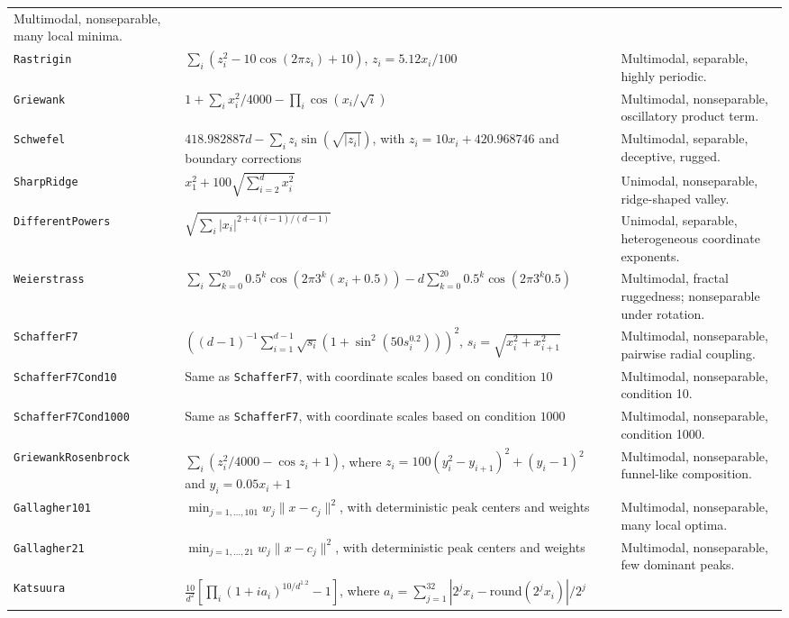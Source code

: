 \documentclass[journal]{IEEEtran}
\theoremstyle{remark}
\theoremstyle{plain}
\begin{document}
\begin{longtable}{@{}p{}p{}p{}@{}}
	Multimodal, nonseparable, many local minima. \\
	\texttt{Rastrigin} &
	\(\sum_i (z_i^2-10\cos(2\pi z_i)+10)\), \(z_i=5.12x_i/100\) &
	Multimodal, separable, highly periodic. \\
	\texttt{Griewank} &
	\(1+\sum_i x_i^2/4000-\prod_i\cos(x_i/\sqrt{i})\) &
	Multimodal, nonseparable, oscillatory product term. \\
	\texttt{Schwefel} &
	\(418.982887d-\sum_i z_i\sin(\sqrt{|z_i|})\), with
	\(z_i=10x_i+420.968746\) and boundary corrections &
	Multimodal, separable, deceptive, rugged. \\
	\texttt{SharpRidge} &
	\(x_1^2+100\sqrt{\sum_{i=2}^d x_i^2}\) &
	Unimodal, nonseparable, ridge-shaped valley. \\
	\texttt{DifferentPowers} &
	\(\sqrt{\sum_i |x_i|^{2+4(i-1)/(d-1)}}\) &
	Unimodal, separable, heterogeneous coordinate exponents. \\
	\texttt{Weierstrass} &
	\(\sum_i\sum_{k=0}^{20}0.5^k\cos(2\pi3^k(x_i+0.5))
	-d\sum_{k=0}^{20}0.5^k\cos(2\pi3^k0.5)\) &
	Multimodal, fractal ruggedness; nonseparable under rotation. \\
	\texttt{SchafferF7} &
	\(\left((d-1)^{-1}\sum_{i=1}^{d-1}\sqrt{s_i}
	(1+\sin^2(50s_i^{0.2}))\right)^2\),
	\(s_i=\sqrt{x_i^2+x_{i+1}^2}\) &
	Multimodal, nonseparable, pairwise radial coupling. \\
	\texttt{SchafferF7Cond10} &
	Same as \texttt{SchafferF7}, with coordinate scales based on condition
	\(10\) &
	Multimodal, nonseparable, condition 10. \\
	\texttt{SchafferF7Cond1000} &
	Same as \texttt{SchafferF7}, with coordinate scales based on condition
	\(1000\) &
	Multimodal, nonseparable, condition 1000. \\
	\texttt{GriewankRosenbrock} &
	\(\sum_i\left(z_i^2/4000-\cos z_i+1\right)\), where
	\(z_i=100(y_i^2-y_{i+1})^2+(y_i-1)^2\) and \(y_i=0.05x_i+1\) &
	Multimodal, nonseparable, funnel-like composition. \\
	\texttt{Gallagher101} &
	\(\min_{j=1,\ldots,101} w_j\|x-c_j\|^2\), with deterministic peak
	centers and weights &
	Multimodal, nonseparable, many local optima. \\
	\texttt{Gallagher21} &
	\(\min_{j=1,\ldots,21} w_j\|x-c_j\|^2\), with deterministic peak
	centers and weights &
	Multimodal, nonseparable, few dominant peaks. \\
	\texttt{Katsuura} &
	\(\frac{10}{d^2}\left[\prod_i(1+i a_i)^{10/d^{1.2}}-1\right]\),
	where \(a_i=\sum_{j=1}^{32}|2^jx_i-\mathrm{round}(2^jx_i)|/2^j\) &

\end{longtable}
\end{document}
